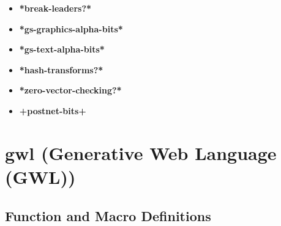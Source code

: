 \documentclass [11pt]{book}
\begin{document}
\label{subsec:variablesandconstants}



\begin{itemize}

\item {}
\label{prim:*break-leaders?*}
\textbf{*break-leaders?*}





\item {}
\label{prim:*gs-graphics-alpha-bits*}
\textbf{*gs-graphics-alpha-bits*}





\item {}
\label{prim:*gs-text-alpha-bits*}
\textbf{*gs-text-alpha-bits*}





\item {}
\label{prim:*hash-transforms?*}
\textbf{*hash-transforms?*}





\item {}
\label{prim:*zero-vector-checking?*}
\textbf{*zero-vector-checking?*}





\item {}
\label{prim:+postnet-bits+}
\textbf{+postnet-bits+}





\end{itemize}





\section{gwl (Generative Web Language (GWL))}

\label{sec:gwl(generativeweblanguage(gwl))}





\subsection{Function and Macro Definitions}
\end{document}
